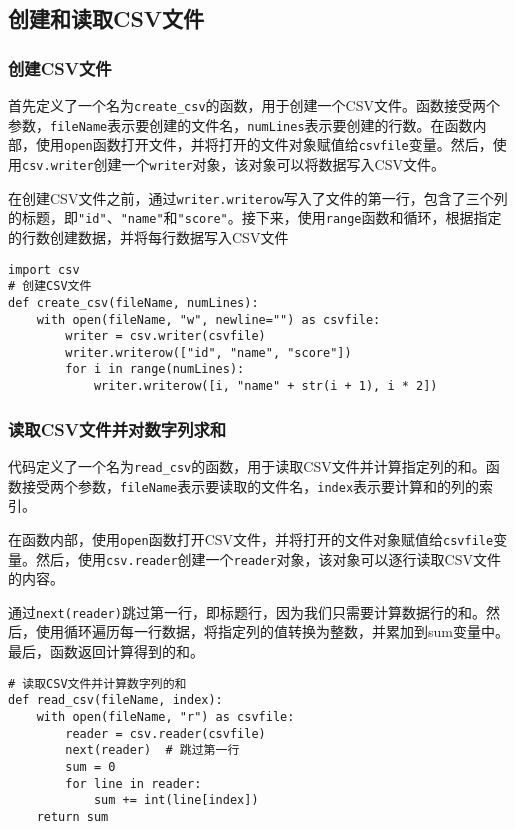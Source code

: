 \documentclass[lang=cn,11pt,a4paper]{elegantpaper}
\begin{document}
\subsection{创建和读取CSV文件}

\subsubsection{创建CSV文件}

首先定义了一个名为\lstinline{create_csv}的函数，用于创建一个CSV文件。函数接受两个参数，\lstinline{fileName}表示要创建的文件名，\lstinline{numLines}表示要创建的行数。在函数内部，使用\lstinline{open}函数打开文件，并将打开的文件对象赋值给\lstinline{csvfile}变量。然后，使用\lstinline{csv.writer}创建一个\lstinline{writer}对象，该对象可以将数据写入CSV文件。

在创建CSV文件之前，通过\lstinline{writer.writerow}写入了文件的第一行，包含了三个列的标题，即\lstinline{"id"}、\lstinline{"name"}和\lstinline{"score"}。接下来，使用\lstinline{range}函数和循环，根据指定的行数创建数据，并将每行数据写入CSV文件

\begin{lstlisting}
import csv
# 创建CSV文件
def create_csv(fileName, numLines):
    with open(fileName, "w", newline="") as csvfile:
        writer = csv.writer(csvfile)
        writer.writerow(["id", "name", "score"])
        for i in range(numLines):
            writer.writerow([i, "name" + str(i + 1), i * 2])
\end{lstlisting}

\subsubsection{读取CSV文件并对数字列求和}
代码定义了一个名为\lstinline{read_csv}的函数，用于读取CSV文件并计算指定列的和。函数接受两个参数，\lstinline{fileName}表示要读取的文件名，\lstinline{index}表示要计算和的列的索引。

在函数内部，使用\lstinline{open}函数打开CSV文件，并将打开的文件对象赋值给\lstinline{csvfile}变量。然后，使用\lstinline{csv.reader}创建一个\lstinline{reader}对象，该对象可以逐行读取CSV文件的内容。

通过\lstinline{next(reader)}跳过第一行，即标题行，因为我们只需要计算数据行的和。然后，使用循环遍历每一行数据，将指定列的值转换为整数，并累加到sum变量中。最后，函数返回计算得到的和。
\begin{lstlisting}
# 读取CSV文件并计算数字列的和
def read_csv(fileName, index):
    with open(fileName, "r") as csvfile:
        reader = csv.reader(csvfile)
        next(reader)  # 跳过第一行
        sum = 0
        for line in reader:
            sum += int(line[index])
    return sum
\end{lstlisting}
\end{document}
